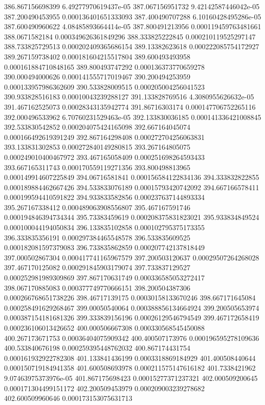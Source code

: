 {386.867156698399 6.49277970619437e-05
387.067156951732 9.42142587446042e-05
387.200490453955 0.000136401651333093
387.400490707288 6.10160428495286e-05
387.600490960622 4.08485893664414e-05
387.800491213956 0.000119459763481661
388.0671582184 0.000349626361849296
388.333825222845 0.000210119525297147
388.733825729513 0.000202409365686154
389.13382623618 0.000222085754172927
389.267159738402 0.000181604215517804
389.600493493958 0.000161884710848165
389.800493747292 0.000136373770659278
390.000494000626 0.000141555717019467
390.200494253959 0.000133957986362609
390.533828009515 0.000205004256041523
390.933828516183 0.00010043239288127
391.133828769516 4.3080955626632e-05
391.467162525073 0.00028343135942774
391.86716303174 0.000147706752265116
392.000496533962 6.70760231529463e-05
392.133830036185 0.000141336421008845
392.533830542852 0.000204075424165098
392.667164045074 0.000166492619391249
392.867164298408 0.000272704256063831
393.133831302853 0.000272840149280815
393.267164805075 0.000249010400467972
393.467165058409 0.000251698264593433
393.667165311743 0.000170559119271356
393.800498813965 0.000149914607225849
394.06716581841 0.000156584122834136
394.333832822855 0.000189884462667426
394.533833076189 0.00015793420742092
394.667166578411 0.000199594410591822
394.933833582856 0.000237637144893334
395.267167338412 0.000489063908556807
395.467167591746 0.000194846394734344
395.73383459619 0.000208375831823021
395.933834849524 0.000100044194050834
396.133835102858 0.000102795375173355
396.333835356191 0.000297384465548578
396.533835609525 0.000182081597379083
396.733835862859 0.000207742137818449
397.000502867304 0.000417741165967579
397.200503120637 0.00029507264268028
397.467170125082 0.000291845903179074
397.733837129527 0.000252981989309869
397.867170631749 0.000336585053272417
398.067170885083 0.000377749770666151
398.200504387306 0.000266768651738226
398.46717139175 0.00030158133670246
398.667171645084 0.000258491629268467
399.00050540064 0.000388856134664924
399.200505653974 0.000387154181681326
399.333839156196 0.00026129546794549
399.467172658419 0.000236106013426652
400.000506667308 0.000330568545450088
400.267173671753 0.00036404075909342
400.400507173976 0.000196595278109636
400.533840676198 0.000259395448762032
400.867174431754 0.000161932922782308
401.133841436199 0.0003318869184929
401.400508440644 0.000150719184941358
401.600508693978 0.000211575147616182
401.7338421962 9.07463975373976e-05
401.867175698423 0.00015277371237321
402.000509200645 0.000171304499151172
402.200509453979 0.000209003239278682
402.600509960646 0.000173153075631713
}
